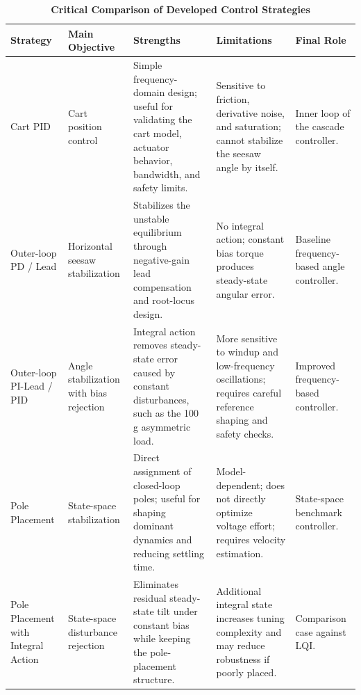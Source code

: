 \documentclass[11pt,a4paper]{article}
\begin{document}
\begin{table}[H]
\caption*{\textbf{Critical Comparison of Developed Control Strategies}}
\centering
\footnotesize
\setlength{\tabcolsep}{4pt}
\renewcommand{\arraystretch}{1.28}
\begin{tabularx}{\textwidth}{|
>{\raggedright\arraybackslash}p{}|
>{\raggedright\arraybackslash}p{}|
>{\raggedright\arraybackslash}X|
>{\raggedright\arraybackslash}X|
>{\raggedright\arraybackslash}p{}|}
\hline
\rowcolor{bluePoli!40}
\textbf{Strategy} & \textbf{Main Objective} & \textbf{Strengths} & \textbf{Limitations} & \textbf{Final Role} \T\B \\
\hline \hline

Cart PID &
Cart position control &
Simple frequency-domain design; useful for validating the cart model, actuator behavior, bandwidth, and safety limits. &
Sensitive to friction, derivative noise, and saturation; cannot stabilize the seesaw angle by itself. &
Inner loop of the cascade controller. \T\B \\
\hline

Outer-loop PD / Lead &
Horizontal seesaw stabilization &
Stabilizes the unstable equilibrium through negative-gain lead compensation and root-locus design. &
No integral action; constant bias torque produces steady-state angular error. &
Baseline frequency-based angle controller. \T\B \\
\hline

Outer-loop PI-Lead / PID &
Angle stabilization with bias rejection &
Integral action removes steady-state error caused by constant disturbances, such as the 100 g asymmetric load. &
More sensitive to windup and low-frequency oscillations; requires careful reference shaping and safety checks. &
Improved frequency-based controller. \T\B \\
\hline

Pole Placement &
State-space stabilization &
Direct assignment of closed-loop poles; useful for shaping dominant dynamics and reducing settling time. &
Model-dependent; does not directly optimize voltage effort; requires velocity estimation. &
State-space benchmark controller. \T\B \\
\hline

Pole Placement with Integral Action &
State-space disturbance rejection &
Eliminates residual steady-state tilt under constant bias while keeping the pole-placement structure. &
Additional integral state increases tuning complexity and may reduce robustness if poorly placed. &
Comparison case against LQI. \T\B \\
\hline


\end{tabularx}
\end{table}
\end{document}
